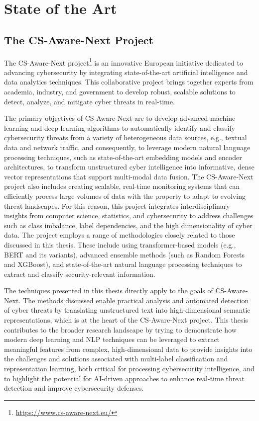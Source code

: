 \chapter{State of the Art}\label{ch:state-of-the-art}


\section{The CS-Aware-Next Project}\label{sec:the-cs-aware-next-project}
The CS-Aware-Next project{\footnote{\href{https://www.cs-aware-next.eu/}{https://www.cs-aware-next.eu/}}} is an innovative European initiative dedicated to advancing cybersecurity by integrating state-of-the-art artificial intelligence and data analytics techniques. This collaborative project brings together experts from academia, industry, and government to develop robust, scalable solutions to detect, analyze, and mitigate cyber threats in real-time.

The primary objectives of CS-Aware-Next are to develop advanced machine learning and deep learning algorithms to automatically identify and classify cybersecurity threats from a variety of heterogeneous data sources, e.g., textual data and network traffic, and consequently, to leverage modern natural language processing techniques, such as state-of-the-art embedding models and encoder architectures, to transform unstructured cyber intelligence into informative, dense vector representations that support multi-modal data fusion. The CS-Aware-Next project also includes creating scalable, real-time monitoring systems that can efficiently process large volumes of data with the property to adapt to evolving threat landscapes. For this reason, this project integrates interdisciplinary insights from computer science, statistics, and cybersecurity to address challenges such as class imbalance, label dependencies, and the high dimensionality of cyber data. The project employs a range of methodologies closely related to those discussed in this thesis. These include using transformer-based models (e.g., BERT and its variants), advanced ensemble methods (such as Random Forests and XGBoost), and state-of-the-art natural language processing techniques to extract and classify security-relevant information.

The techniques presented in this thesis directly apply to the goals of CS-Aware-Next. The methods discussed enable practical analysis and automated detection of cyber threats by translating unstructured text into high-dimensional semantic representations, which is at the heart of the CS-Aware-Next project. This thesis contributes to the broader research landscape by trying to demonstrate how modern deep learning and NLP techniques can be leveraged to extract meaningful features from complex, high-dimensional data to provide insights into the challenges and solutions associated with multi-label classification and representation learning, both critical for processing cybersecurity intelligence, and to highlight the potential for AI-driven approaches to enhance real-time threat detection and improve cybersecurity defenses.

